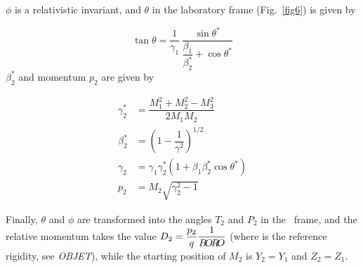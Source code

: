 $\phi$ is a relativistic invariant, and $\theta$ in the laboratory
frame (Fig.~\ref{fig6}) is given by    

$$ \tan \theta = \dfrac{1 }{ \gamma_1}\, 
    \dfrac{ \sin \theta^ \ast }{\dfrac{\beta_1 }{ \beta^ \ast_ 2}+ \cos \theta^\ast} 
    $$
%
  $ \beta^ \ast_ 2 $ and momentum $ p_2 $ are given by 

 \begin{align*}
	 \gamma^\ast_ 2 
	         & = \dfrac{M^2_1 + M^2_2 - M^2_3 }{ 2M_1M_2} \\
	\beta^\ast_ 2 
	         & =  \left( 1- \dfrac{1 }{ \gamma^ 2} \right)^{1/2} \\
	\gamma_2
	         & =   \gamma_1\gamma^ \ast_ 2 
	         	\left(1+\beta_1 \beta^\ast_ 2 \cos \theta^ \ast \right) \\
	p_2 
	         & = M_2 \sqrt{ \gamma^2_2 -1} 
 \end{align*}
 
\noindent Finally, $\theta$ and $\phi$ are transformed into the angles $ T_2 $
and $ P_2 $ in the \zgou\ frame, and the relative momentum takes the value 
$ D_2= \dfrac{p_2 }{ q} \dfrac{1}{B\!O\!R\!O} $ (where \BORO   
is the reference rigidity, see \textsl{OBJET}), while the starting position of 
$M_2 $ is $ Y_2=Y_1 $ and $ Z_2=Z_1 $.   
\bigskip

